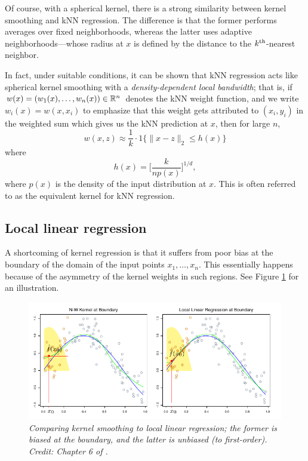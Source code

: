 \documentclass{article}
\begin{document}
Of course, with a spherical kernel, there is a strong similarity between kernel
smoothing and kNN regression. The difference is that the former performs
averages over fixed neighborhoods, whereas the latter uses adaptive
neighborhoods---whose radius at $x$ is defined by the distance to the
$k^{\text{th}}$-nearest neighbor.  

In fact, under suitable conditions, it can be shown that kNN regression acts
like spherical kernel smoothing with a \emph{density-dependent local bandwidth}; 
that is, if $w(x) = (w_1(x), \dots, w_n(x)) \in \mathbb{R}^n$ denotes the kNN weight
function, and we write $w_i(x) = w(x, x_i)$ to emphasize that this weight gets
attributed to $(x_i, y_i)$ in the weighted sum  which gives us the kNN prediction at $x$, then for large $n$, 
\[
w(x, z) \approx \frac{1}{k} \cdot 1\{ \|x - z\|_2 \leq h(x) \} 
\]
where 
\[
h(x) = \bigg[ \frac{k}{n p(x)} \bigg]^{1/d},
\]
where $p(x)$ is the density of the input distribution at $x$. This is often
referred to as the equivalent kernel for kNN regression.  

\subsection{Local linear regression}

A shortcoming of kernel regression is that it suffers from poor bias at the
boundary of the domain of the input points $x_1,\dots,x_n$. This essentially
happens because of the asymmetry of the kernel weights in such regions. See
Figure \ref{fig:bias} for an illustration. 

\begin{figure}[tb]
\centering
\includegraphics[width=\textwidth]{bias.pdf}
\caption{\it Comparing kernel smoothing to local linear regression; the former
  is biased at the boundary, and the latter is unbiased (to
  first-order). Credit: Chapter 6 of \citet{hastie2009elements}.}  
\label{fig:bias}
\end{figure}
\end{document}
